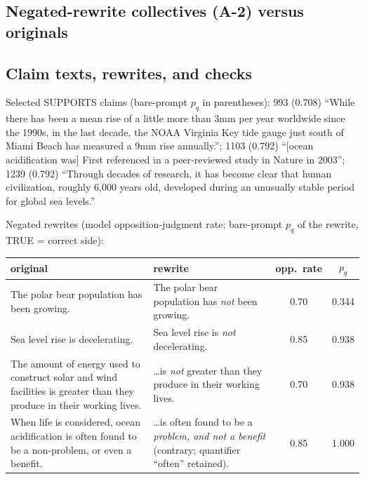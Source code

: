 \documentclass[11pt]{article}
\begin{document}
\subsection{Negated-rewrite collectives (A-2) versus originals}
\begin{center}
\small

\end{center}

\subsection{Claim texts, rewrites, and checks}

Selected SUPPORTS claims (bare-prompt $p_q$ in parentheses): 993 (0.708)
``While there has been a mean rise of a little more than 3mm per year
worldwide since the 1990s, in the last decade, the NOAA Virginia Key tide
gauge just south of Miami Beach has measured a 9mm rise annually.''; 1103
(0.792) ``[ocean acidification was] First referenced in a peer-reviewed study
in Nature in 2003''; 1239 (0.792) ``Through decades of research, it has
become clear that human civilization, roughly 6,000 years old, developed
during an unusually stable period for global sea levels.''

Negated rewrites (model opposition-judgment rate; bare-prompt $p_q$ of the
rewrite, TRUE = correct side):

\begin{center}
\small
\begin{tabular}{p{5.6cm}p{5.6cm}cc}
\toprule
original & rewrite & opp.\ rate & $p_q$ \\
\midrule
The polar bear population has been growing. &
The polar bear population has \emph{not} been growing. & 0.70 & 0.344 \\
Sea level rise is decelerating. &
Sea level rise is \emph{not} decelerating. & 0.85 & 0.938 \\
The amount of energy used to construct solar and wind facilities is greater
than they produce in their working lives. &
\ldots is \emph{not} greater than they produce in their working lives. &
0.70 & 0.938 \\
When life is considered, ocean acidification is often found to be a
non-problem, or even a benefit. &
\ldots is often found to be a \emph{problem, and not a benefit}
(contrary; quantifier ``often'' retained). & 0.85 & 1.000 \\
\bottomrule
\end{tabular}
\end{center}
\end{document}
